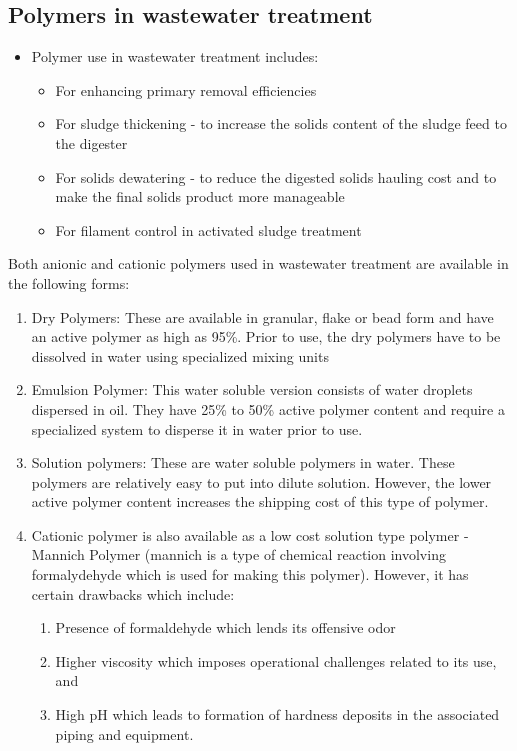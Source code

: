 \subsection{Polymers in wastewater treatment} 
        	\begin{itemize}
        		\item Polymer use in wastewater treatment includes:
        			\begin{itemize}
        				\item For enhancing primary removal efficiencies
        				\item For sludge thickening - to increase the solids content of the sludge feed to the digester
        				\item For solids dewatering - to reduce the digested solids hauling cost and to make the final solids product more manageable
        				\item For filament control in activated sludge treatment
        			\end{itemize}
        	\end{itemize}
  

\vspace{0.6cm}
Both anionic and cationic polymers used in wastewater treatment are available in the following forms: 
\begin{enumerate}
\item Dry Polymers:  These are available in granular, flake or bead form and have an active polymer as high as 95\%.  Prior to use, the dry polymers have to be dissolved in water using specialized mixing units 
\item Emulsion Polymer:  This water soluble version consists of water droplets dispersed in oil.  They have 25\% to 50\% active polymer content and require a specialized system to disperse it in water prior to use.
\item Solution polymers:  These are water soluble polymers in water. These polymers are relatively easy to put into dilute solution.  However, the lower active polymer content increases the shipping cost of this type of polymer.
\item Cationic polymer is also available as a low cost solution type polymer - Mannich Polymer (mannich is a type of chemical reaction involving formalydehyde which is used for making this polymer).  However, it has certain drawbacks which include: 
\begin{enumerate}
\item Presence of formaldehyde which lends its offensive odor
\item Higher viscosity which imposes operational challenges related to its use, and
\item High pH which leads to formation of hardness deposits in the associated piping and equipment.
\end{enumerate}
\end{enumerate}

